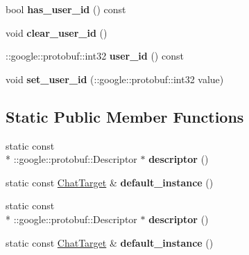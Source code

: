 \begin{DoxyCompactItemize}
\item 
\hypertarget{classSimpleChat_1_1ChatTarget_a0831d25def649fe153f0e3075bbbfac6}{bool {\bfseries has\-\_\-user\-\_\-id} () const }\label{classSimpleChat_1_1ChatTarget_a0831d25def649fe153f0e3075bbbfac6}

\item 
\hypertarget{classSimpleChat_1_1ChatTarget_a0e07f02eeb547853bdce8e2745d55fd2}{void {\bfseries clear\-\_\-user\-\_\-id} ()}\label{classSimpleChat_1_1ChatTarget_a0e07f02eeb547853bdce8e2745d55fd2}

\item 
\hypertarget{classSimpleChat_1_1ChatTarget_a38f80ef4a9b6dd30d4c6f93657f9230e}{\-::google\-::protobuf\-::int32 {\bfseries user\-\_\-id} () const }\label{classSimpleChat_1_1ChatTarget_a38f80ef4a9b6dd30d4c6f93657f9230e}

\item 
\hypertarget{classSimpleChat_1_1ChatTarget_aa8851c988d1010b224705df2a4889116}{void {\bfseries set\-\_\-user\-\_\-id} (\-::google\-::protobuf\-::int32 value)}\label{classSimpleChat_1_1ChatTarget_aa8851c988d1010b224705df2a4889116}

\end{DoxyCompactItemize}
\subsection*{Static Public Member Functions}
\begin{DoxyCompactItemize}
\item 
\hypertarget{classSimpleChat_1_1ChatTarget_a7d09d1903755f3b96eb4dfa5cb654cb5}{static const \\*
\-::google\-::protobuf\-::\-Descriptor $\ast$ {\bfseries descriptor} ()}\label{classSimpleChat_1_1ChatTarget_a7d09d1903755f3b96eb4dfa5cb654cb5}

\item 
\hypertarget{classSimpleChat_1_1ChatTarget_ac0fbbc1763163ab89e04a6fc776ce59f}{static const \hyperlink{classSimpleChat_1_1ChatTarget}{Chat\-Target} \& {\bfseries default\-\_\-instance} ()}\label{classSimpleChat_1_1ChatTarget_ac0fbbc1763163ab89e04a6fc776ce59f}

\item 
\hypertarget{classSimpleChat_1_1ChatTarget_a7d09d1903755f3b96eb4dfa5cb654cb5}{static const \\*
\-::google\-::protobuf\-::\-Descriptor $\ast$ {\bfseries descriptor} ()}\label{classSimpleChat_1_1ChatTarget_a7d09d1903755f3b96eb4dfa5cb654cb5}

\item 
\hypertarget{classSimpleChat_1_1ChatTarget_ac0fbbc1763163ab89e04a6fc776ce59f}{static const \hyperlink{classSimpleChat_1_1ChatTarget}{Chat\-Target} \& {\bfseries default\-\_\-instance} ()}\label{classSimpleChat_1_1ChatTarget_ac0fbbc1763163ab89e04a6fc776ce59f}

\end{DoxyCompactItemize}
